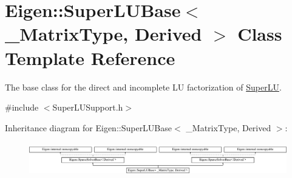 \hypertarget{class_eigen_1_1_super_l_u_base}{}\section{Eigen\+:\+:Super\+L\+U\+Base$<$ \+\_\+\+Matrix\+Type, Derived $>$ Class Template Reference}
\label{class_eigen_1_1_super_l_u_base}


The base class for the direct and incomplete LU factorization of \hyperlink{class_eigen_1_1_super_l_u}{Super\+LU}.  




{\ttfamily \#include $<$Super\+L\+U\+Support.\+h$>$}

Inheritance diagram for Eigen\+:\+:Super\+L\+U\+Base$<$ \+\_\+\+Matrix\+Type, Derived $>$\+:\begin{figure}[H]
\begin{center}
\leavevmode
\includegraphics[height=1.484099cm]{class_eigen_1_1_super_l_u_base}
\end{center}
\end{figure}

